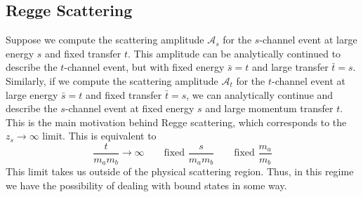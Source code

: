 \subsection{Regge Scattering}
Suppose we compute the scattering amplitude $\mathcal{A}_{s}$ for the $s$-channel event at large energy $s$ and fixed transfer $t$. This amplitude can be analytically continued to describe the $t$-channel event, but with fixed energy $\bar{s}= t$ and large transfer $\bar{t} = s$. Similarly, if we compute the scattering amplitude $\mathcal{A}_{t}$ for the $t$-channel event at large energy $\bar{s} = t$ and fixed transfer $\bar{t} = s$, we can analytically continue and describe the $s$-channel event at fixed energy $s$ and large momentum transfer $t$. This is the main motivation behind Regge scattering, which corresponds to the $z_{s} \rightarrow \infty$ limit. This is equivalent to
\begin{equation}
	\frac{t}{m_{a} m_{b}} \rightarrow \infty \qquad \text{fixed } \frac{s}{m_{a} m_{b}} \qquad \text{fixed } \frac{m_{a}}{m_{b}}
\end{equation}
This limit takes us outside of the physical scattering region. Thus, in this regime we have the possibility of dealing with bound states in some way.
